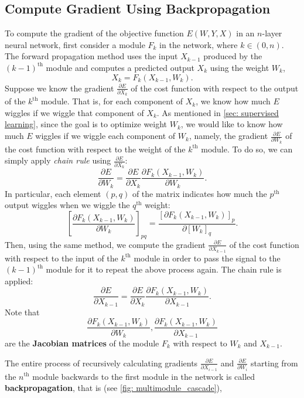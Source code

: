 \subsection{Compute Gradient Using Backpropagation}\label{ssc: Compute SGD using backprop}

To compute the gradient of the objective function $E(W,Y,X)$ in an $n$-layer neural network, first consider a module $F_k$ in the network, where $k\in (0, n)$.
The forward propagation method uses the input $X_{k-1}$ produced by the $(k-1)^{\text{th}}$ module and computes a predicted output $X_k$ using the weight $W_k$,
\[ X_k=F_k(X_{k-1},W_k). \]
Suppose we know the gradient $\frac{\partial E}{\partial X_k}$ of the cost function with respect to the output of the $k^\text{th}$ module.
That is, for each component of $X_k$, we know how much $E$ wiggles if we wiggle that component of $X_k$.
As mentioned in \cref{sec: supervised learning}, since the goal is to optimize weight $W_k$, we would like to know how much $E$ wiggles if we wiggle each component of $W_k$, namely, the gradient $\frac{\partial E}{\partial W_k}$ of the cost function with respect to the weight of the $k^\text{th}$ module.
To do so, we can simply apply \textit{chain rule} using $\frac{\partial E}{\partial X_k}$:
\[
\frac{\partial E}{\partial W_k} = \frac{\partial E}{\partial X_k} \frac{\partial F_k(X_{k-1},W_k)}{\partial W_k}.
\]
In particular, each element $(p,q)$ of the matrix indicates how much the $p^\text{th}$ output wiggles when we wiggle the $q^\text{th}$ weight:
\[
\left[ \frac{\partial F_k(X_{k-1},W_k)}{\partial W_k} \right]_{pq} = \frac{[\partial F_k(X_{k-1},W_k)]_p}{\partial [W_k]_q}.
\]
Then, using the same method, we compute the gradient $\frac{\partial E}{\partial X_{k-1}}$ of the cost function with respect to the input of the $k^\text{th}$ module in order to pass the signal to the $(k-1)^\text{th}$ module for it to repeat the above process again.
The chain rule is applied:
\[
\frac{\partial E}{\partial X_{k-1}} = \frac{\partial E}{\partial X_k} \frac{\partial F_k(X_{k-1},W_k)}{\partial X_{k-1}}.
\]
Note that
\[
\frac{\partial F_k(X_{k-1},W_k)}{\partial W_k}, \frac{\partial F_k(X_{k-1},W_k)}{\partial X_{k-1}}
\]
are the \textbf{Jacobian matrices} of the module $F_k$ with respect to  $W_k$ and $X_{k-1}$.

The entire process of recursively calculating gradients $\frac{\partial E}{\partial X_{i-1}}$ and $\frac{\partial E}{\partial W_i}$ starting from the $n^\text{th}$ module backwards to the first module in the network is called \textbf{backpropagation}, that is (see \cref{fig: multimodule_cascade}),

